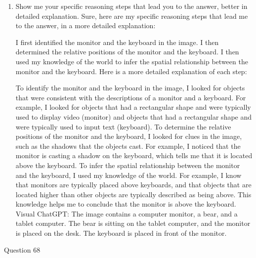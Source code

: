 \begin{enumerate}
    Here are some additional details about the spatial relationship between the monitor and the keyboard:
    
    The monitor is a display device that is used to output video.
    The keyboard is an input device that is used to input text and other commands.
    The monitor is above the keyboard, meaning that it is located higher than the keyboard.
    The keyboard is below the monitor, meaning that it is located lower than the monitor.
    Is there anything else I can help you with?
    \subitem Visual ChatGPT: The monitor is placed on the desk, and the keyboard is placed in front of the monitor.
    \item Show me your specific reasoning steps that lead you to the answer, better in detailed explanation.
    \subitem 
    Sure, here are my specific reasoning steps that lead me to the answer, in a more detailed explanation:
    
    I first identified the monitor and the keyboard in the image.
    I then determined the relative positions of the monitor and the keyboard.
    I then used my knowledge of the world to infer the spatial relationship between the monitor and the keyboard.
    Here is a more detailed explanation of each step:
    
    To identify the monitor and the keyboard in the image, I looked for objects that were consistent with the descriptions of a monitor and a keyboard. For example, I looked for objects that had a rectangular shape and were typically used to display video (monitor) and objects that had a rectangular shape and were typically used to input text (keyboard).
    To determine the relative positions of the monitor and the keyboard, I looked for clues in the image, such as the shadows that the objects cast. For example, I noticed that the monitor is casting a shadow on the keyboard, which tells me that it is located above the keyboard.
    To infer the spatial relationship between the monitor and the keyboard, I used my knowledge of the world. For example, I know that monitors are typically placed above keyboards, and that objects that are located higher than other objects are typically described as being above. This knowledge helps me to conclude that the monitor is above the keyboard.
    \subitem Visual ChatGPT: The image contains a computer monitor, a bear, and a tablet computer. The bear is sitting on the tablet computer, and the monitor is placed on the desk. The keyboard is placed in front of the monitor.
\end{enumerate}
Question 68\\
